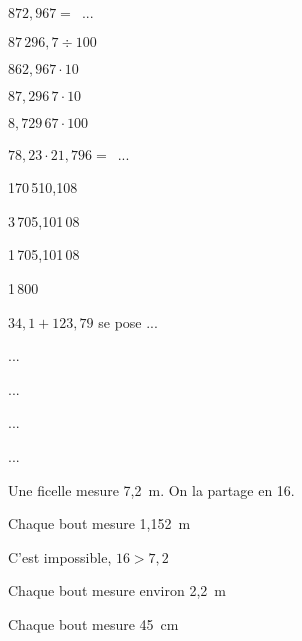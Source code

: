  \begin{QCM}
\begin{GroupeQCM}
     \begin{exercice}
      $872,967 =$ ...
      \begin{ChoixQCM}{4}
      \item $87\,296,7 \div 100$
      \item $862,967 \cdot10$
      \item $87,296\,7 \cdot 10$
      \item $8,729\,67 \cdot 100$
      \end{ChoixQCM}
      \begin{corrige}
   \end{corrige}
    \end{exercice}
    
     \begin{exercice}
      $78,23 \cdot 21,796 =$ ...
      \begin{ChoixQCM}{4}
      \item 170\,510,108
      \item 3\,705,101\,08
      \item 1\,705,101\,08
      \item 1\,800
      \end{ChoixQCM}
      \begin{corrige}
   \end{corrige}
    \end{exercice}
    
     \begin{exercice}
      $34,1 + 123,79$ se pose ...
      \begin{ChoixQCM}{4}
      \item ...
      \item ...
      \item ...
      \item ...
      \end{ChoixQCM}
      \begin{corrige}
   \end{corrige}
    \end{exercice}

    
     \begin{exercice}
      Une ficelle mesure 7,2 m. On la partage en 16.
      \begin{ChoixQCM}{4}
      \item Chaque bout mesure 1,152 m
      \item C'est impossible, $16 > 7,2$
      \item Chaque bout mesure environ 2,2 m
      \item Chaque bout mesure 45 cm
      \end{ChoixQCM}
      \begin{corrige}
   \end{corrige}
    \end{exercice}
    

\end{GroupeQCM}
\end{QCM}

